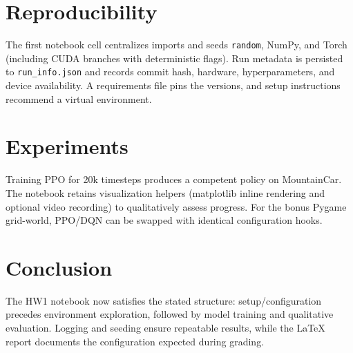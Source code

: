 \documentclass[conference]{IEEEtran}
\begin{document}
\section{Reproducibility}
The first notebook cell centralizes imports and seeds \texttt{random}, NumPy, and Torch (including CUDA branches with deterministic flags). Run metadata is persisted to \texttt{run\_info.json} and records commit hash, hardware, hyperparameters, and device availability. A requirements file pins the versions, and setup instructions recommend a virtual environment.

\section{Experiments}
Training PPO for 20k timesteps produces a competent policy on MountainCar. The notebook retains visualization helpers (matplotlib inline rendering and optional video recording) to qualitatively assess progress. For the bonus Pygame grid-world, PPO/DQN can be swapped with identical configuration hooks.

\section{Conclusion}
The HW1 notebook now satisfies the stated structure: setup/configuration precedes environment exploration, followed by model training and qualitative evaluation. Logging and seeding ensure repeatable results, while the LaTeX report documents the configuration expected during grading.
\end{document}
